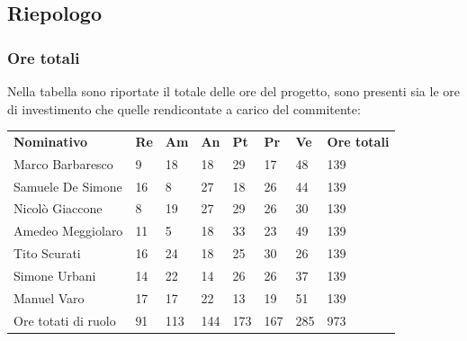 \subsection{Riepologo}
    \subsubsection{Ore totali}
        Nella tabella sono riportate il totale delle ore del progetto, sono presenti sia le ore di investimento che quelle rendicontate a carico del commitente:
            \begin{center}
                \begin{table}[ht!]
                    \centering
                    \renewcommand{\arraystretch}{1.8}
                    \begin{tabular}{p{100px} p{20px} p{20px} p{20px} p{20px} p{20px} p{20px} p{50px} }
                        \rowcolor{logo!70} \textbf{Nominativo} & \textbf{Re} & \textbf{Am} & \textbf{An} & \textbf{Pt} & \textbf{Pr} & \textbf{Ve} & \textbf{Ore totali}\\
                        Marco Barbaresco & 9 & 18 & 18 & 29 & 17 & 48 & 139\\
                        Samuele De Simone & 16 & 8 & 27 & 18 & 26 & 44 & 139\\
                        Nicolò Giaccone & 8 & 19 & 27 & 29 & 26 & 30 & 139\\
                        Amedeo Meggiolaro & 11 & 5 & 18 & 33 & 23 & 49 & 139\\
                        Tito Scurati & 16 & 24 & 18 & 25 & 30 & 26 & 139\\
                        Simone Urbani & 14 & 22 & 14 & 26 & 26 & 37 & 139\\
                        Manuel Varo & 17 & 17 & 22 & 13 & 19 & 51 & 139\\
                        Ore totati di ruolo & 91 & 113 & 144 & 173 & 167 & 285 & 973\\
                    \end{tabular}
                \end{table}
            \end{center}
            \pagebreak

